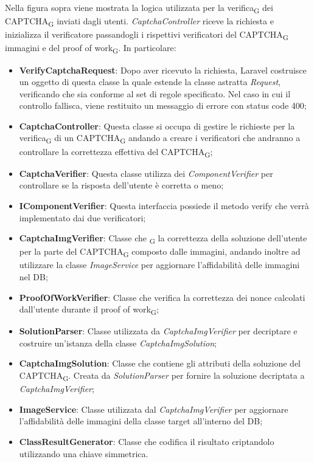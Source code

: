 Nella figura sopra viene mostrata la logica utilizzata per la verifica\textsubscript{G} dei CAPTCHA\textsubscript{G} inviati dagli utenti. \textit{CaptchaController} riceve la richiesta e inizializza il verificatore passandogli i rispettivi verificatori del CAPTCHA\textsubscript{G} immagini e del proof of work\textsubscript{G}.
In particolare:
\begin{itemize}
	\item \textbf{VerifyCaptchaRequest}: Dopo aver ricevuto la richiesta, Laravel costruisce un oggetto di questa classe la quale estende la classe astratta \textit{Request}, verificando che sia conforme al set di regole specificato. Nel caso in cui il controllo fallisca, viene restituito un messaggio di errore con status code 400;
	\item \textbf{CaptchaController}: Questa classe si occupa di gestire le richieste per la verifica\textsubscript{G} di un CAPTCHA\textsubscript{G} andando a creare i verificatori che andranno a controllare la correttezza effettiva del CAPTCHA\textsubscript{G};
	\item \textbf{CaptchaVerifier}: Questa classe utilizza dei \textit{ComponentVerifier} per controllare se la risposta dell'utente è corretta o meno;
	\item \textbf{IComponentVerifier}: Questa interfaccia possiede il metodo verify che verrà implementato dai due verificatori;
	\item \textbf{CaptchaImgVerifier}: Classe che \textsubscript{G} la correttezza della soluzione dell'utente per la parte del CAPTCHA\textsubscript{G} composto dalle immagini, andando inoltre ad utilizzare la classe \textit{ImageService} per aggiornare l'affidabilità delle immagini nel DB;
	\item \textbf{ProofOfWorkVerifier}: Classe che verifica la correttezza dei nonce calcolati dall'utente durante il proof of work\textsubscript{G};
	\item \textbf{SolutionParser}: Classe utilizzata da \textit{CaptchaImgVerifier} per decriptare e costruire un'istanza della classe \textit{CaptchaImgSolution};
	\item \textbf{CaptchaImgSolution}: Classe che contiene gli attributi della soluzione del CAPTCHA\textsubscript{G}. Creata da \textit{SolutionParser} per fornire la soluzione decriptata a \textit{CaptchaImgVerifier};
	\item \textbf{ImageService}: Classe utilizzata dal \textit{CaptchaImgVerifier} per aggiornare l'affidabilità delle immagini della classe target all'interno del DB;
	\item \textbf{ClassResultGenerator}: Classe che codifica il risultato criptandolo utilizzando una chiave simmetrica.
\end{itemize}

